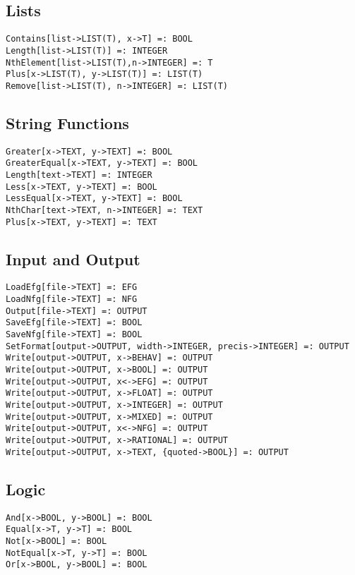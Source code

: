 \subsection{Lists}

\begin{verbatim}
Contains[list->LIST(T), x->T] =: BOOL
Length[list->LIST(T)] =: INTEGER
NthElement[list->LIST(T),n->INTEGER] =: T 
Plus[x->LIST(T), y->LIST(T)] =: LIST(T)
Remove[list->LIST(T), n->INTEGER] =: LIST(T)
\end{verbatim}

\subsection{String Functions}

\begin{verbatim}
Greater[x->TEXT, y->TEXT] =: BOOL
GreaterEqual[x->TEXT, y->TEXT] =: BOOL
Length[text->TEXT] =: INTEGER
Less[x->TEXT, y->TEXT] =: BOOL
LessEqual[x->TEXT, y->TEXT] =: BOOL
NthChar[text->TEXT, n->INTEGER] =: TEXT
Plus[x->TEXT, y->TEXT] =: TEXT
\end{verbatim}


\subsection{Input and Output}

\begin{verbatim}
LoadEfg[file->TEXT] =: EFG
LoadNfg[file->TEXT] =: NFG
Output[file->TEXT] =: OUTPUT
SaveEfg[file->TEXT] =: BOOL
SaveNfg[file->TEXT] =: BOOL
SetFormat[output->OUTPUT, width->INTEGER, precis->INTEGER] =: OUTPUT
Write[output->OUTPUT, x->BEHAV] =: OUTPUT
Write[output->OUTPUT, x->BOOL] =: OUTPUT 
Write[output->OUTPUT, x<->EFG] =: OUTPUT
Write[output->OUTPUT, x->FLOAT] =: OUTPUT
Write[output->OUTPUT, x->INTEGER] =: OUTPUT
Write[output->OUTPUT, x->MIXED] =: OUTPUT
Write[output->OUTPUT, x<->NFG] =: OUTPUT
Write[output->OUTPUT, x->RATIONAL] =: OUTPUT
Write[output->OUTPUT, x->TEXT, {quoted->BOOL}] =: OUTPUT
\end{verbatim}

\subsection{Logic}

\begin{verbatim}
And[x->BOOL, y->BOOL] =: BOOL
Equal[x->T, y->T] =: BOOL
Not[x->BOOL] =: BOOL
NotEqual[x->T, y->T] =: BOOL
Or[x->BOOL, y->BOOL] =: BOOL
\end{verbatim}


